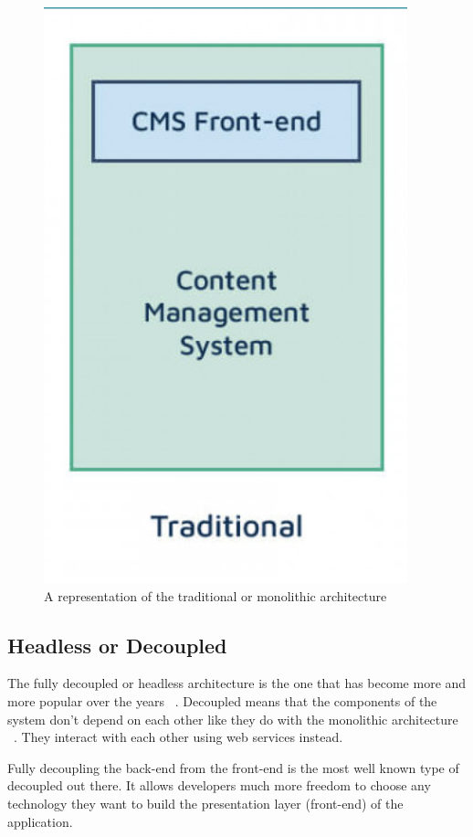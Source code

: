 \begin{figure}
\centering
\includegraphics{./img/Traditional_Architecture}
\caption[Traditional CMS architecture]{A representation of the traditional or monolithic architecture ~\autocite{Dropsolid2021}}
\end{figure}


\subsection{Headless or Decoupled}

The fully decoupled or headless architecture is the one that has become more and more popular over the years ~\autocite{Dropsolid2021}. Decoupled means that the components of the system don't depend on each other like they do with the monolithic architecture ~\autocite{So2018}. They interact with each other using web services instead.

Fully decoupling the back-end from the front-end is the most well known type of decoupled out there. It allows developers much more freedom to choose any technology they want to build the presentation layer (front-end) of the application.

